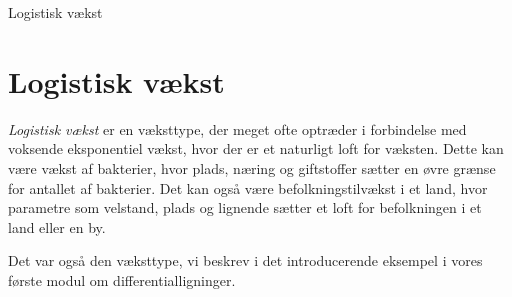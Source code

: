 \begin{center}
\Huge
Logistisk vækst
\end{center}


\section*{Logistisk vækst}

\textit{Logistisk vækst} er en væksttype, der meget ofte optræder i forbindelse med voksende eksponentiel vækst, hvor der er et naturligt loft for væksten. Dette kan være vækst af bakterier, hvor plads, næring og giftstoffer sætter en øvre grænse for antallet af bakterier. Det kan også være befolkningstilvækst i et land, hvor parametre som velstand, plads og lignende sætter et loft for befolkningen i et land eller en by. 

Det var også den væksttype, vi beskrev i det introducerende eksempel i vores første modul om differentialligninger. 

